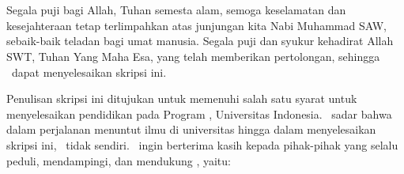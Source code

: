 \chapter*{\kataPengantar}

Segala puji bagi Allah, Tuhan semesta alam, semoga keselamatan dan kesejahteraan tetap terlimpahkan atas junjungan kita Nabi Muhammad SAW, sebaik-baik teladan bagi umat manusia. Segala puji dan syukur kehadirat Allah SWT, Tuhan Yang Maha Esa, yang telah memberikan pertolongan, sehingga \saya~dapat menyelesaikan skripsi ini.

Penulisan skripsi ini ditujukan untuk memenuhi salah satu syarat untuk menyelesaikan pendidikan pada Program \gelar, Universitas Indonesia. \Saya~sadar bahwa dalam perjalanan menuntut ilmu di universitas hingga dalam menyelesaikan skripsi ini, \saya~tidak sendiri. \Saya~ingin berterima kasih kepada pihak-pihak yang selalu peduli, mendampingi, dan mendukung \saya, yaitu:

